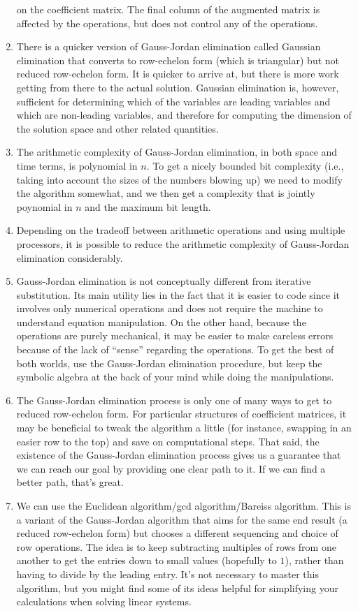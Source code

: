 \documentclass[10pt]{amsart}
\begin{document}
\begin{enumerate}
  on the coefficient matrix. The final column of the augmented matrix
  is affected by the operations, but does not control any of the
  operations.
\item There is a quicker version of Gauss-Jordan elimination called
  Gaussian elimination that converts to row-echelon form (which is
  triangular) but not reduced row-echelon form. It is quicker to
  arrive at, but there is more work getting from there to the actual
  solution. Gaussian elimination is, however, sufficient for
  determining which of the variables are leading variables and which
  are non-leading variables, and therefore for computing the dimension
  of the solution space and other related quantities.
\item The arithmetic complexity of Gauss-Jordan elimination, in both
  space and time terms, is polynomial in $n$. To get a nicely bounded
  bit complexity (i.e., taking into account the sizes of the numbers
  blowing up) we need to modify the algorithm somewhat, and we then
  get a complexity that is jointly poynomial in $n$ and the maximum
  bit length.
\item Depending on the tradeoff between arithmetic operations and
  using multiple processors, it is possible to reduce the arithmetic
  complexity of Gauss-Jordan elimination considerably.
\item Gauss-Jordan elimination is not conceptually different from
  iterative substitution. Its main utility lies in the fact that it is
  easier to code since it involves only numerical operations and does
  not require the machine to understand equation manipulation. On the
  other hand, because the operations are purely mechanical, it may be
  easier to make careless errors because of the lack of ``sense''
  regarding the operations. To get the best of both worlds, use the
  Gauss-Jordan elimination procedure, but keep the symbolic algebra at
  the back of your mind while doing the manipulations.
\item The Gauss-Jordan elimination process is only one of many ways to
  get to reduced row-echelon form. For particular structures of
  coefficient matrices, it may be beneficial to tweak the algorithm a
  little (for instance, swapping in an easier row to the top) and save
  on computational steps. That said, the existence of the Gauss-Jordan
  elimination process gives us a guarantee that we can reach our goal
  by providing one clear path to it. If we can find a better path,
  that's great.
\item We can use the Euclidean algorithm/gcd algorithm/Bareiss
  algorithm. This is a variant of the Gauss-Jordan algorithm that aims
  for the same end result (a reduced row-echelon form) but chooses a
  different sequencing and choice of row operations. The idea is to
  keep subtracting multiples of rows from one another to get the
  entries down to small values (hopefully to $1$), rather than having
  to divide by the leading entry. It's not necessary to master this
  algorithm, but you might find some of its ideas helpful for
  simplifying your calculations when solving linear systems.
\end{enumerate}
\end{document}
